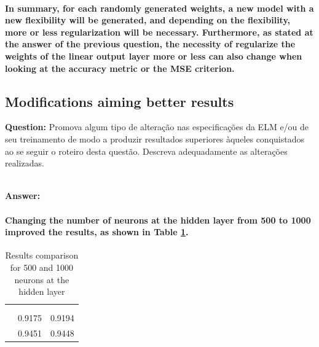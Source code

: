 \documentclass[a4paper]{article}    %
\begin{document}
\paragraph{In summary, for each randomly generated weights, a new model with a new flexibility will be generated, and depending on the flexibility, more or less regularization will be necessary. Furthermore, as stated at the answer of the previous question, the necessity of regularize the weights of the linear output layer more or less can also change when looking at the accuracy metric or the MSE criterion.}

\subsection{Modifications aiming better results}

\textbf{Question:} \newline
Promova algum tipo de alteração nas especificações da ELM e/ou de seu treinamento de modo a produzir resultados superiores àqueles conquistados ao se seguir o roteiro desta questão. Descreva adequadamente as alterações realizadas.

\textbf{\\Answer:}
\paragraph{Changing the number of neurons at the hidden layer from 500 to 1000 improved the results, as shown in Table \ref{tab:elm_improved}.}

\begin{table}[H]
    \begin{center}
        \begin{tabular}{r|c|c|} 
            \cline{2-3}
            & \multicolumn{2}{|c|}{\cellcolor[gray]{0.8}{Accuracy}} \\
            \cline{2-3}
            & \cellcolor[gray]{0.8}{Training set} & \cellcolor[gray]{0.8}{Test set} \\
            \cline{1-3}
            \multicolumn{1}{|r|}{\cellcolor[gray]{0.8}{500 neurons}}  & 0.9175 & 0.9194   \\
            \cline{1-3}
            \multicolumn{1}{|r|}{\cellcolor[gray]{0.8}{1000 neurons}} & 0.9451 & 0.9448 \\
            \cline{1-3}
        \end{tabular}
    \end{center}
    \caption{Results comparison for 500 and 1000 neurons at the hidden layer}
    \label{tab:elm_improved}
\end{table}
\end{document}
